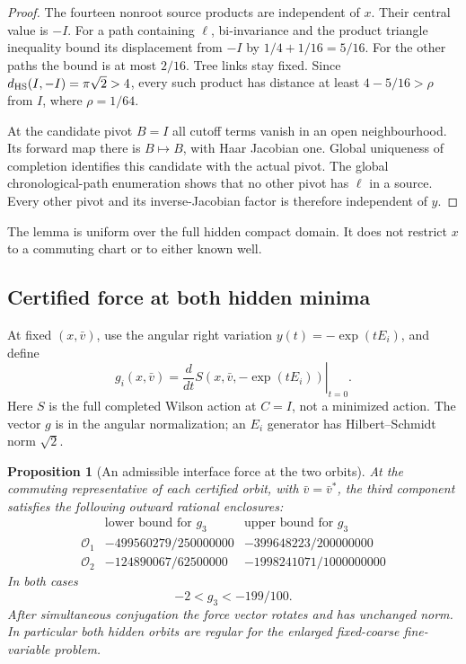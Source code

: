 \documentclass[11pt,oneside]{article}
\newtheorem{proposition}[theorem]{Proposition}
\begin{document}
\begin{proof}
The fourteen nonroot source products are independent
of \(x\). Their central value is \(-I\). For a path
containing \(\ell\), bi-invariance and the product
triangle inequality bound its displacement from
\(-I\) by \(1/4+1/16=5/16\). For the other paths
the bound is at most \(2/16\). Tree links stay fixed.
Since \(d_{\rm HS}(I,-I)=\pi\sqrt2>4\), every such
product has distance at least \(4-5/16>\rho\)
from \(I\), where \(\rho=1/64\).

At the candidate pivot \(B=I\) all cutoff terms
vanish in an open neighbourhood. Its forward map
there is \(B\mapsto B\), with Haar Jacobian one.
Global uniqueness of completion identifies this
candidate with the actual pivot. The global
chronological-path enumeration shows that no
other pivot has \(\ell\) in a source. Every other
pivot and its inverse-Jacobian factor is therefore
independent of \(y\).
\end{proof}

The lemma is uniform over the full hidden compact
domain. It does not restrict \(x\) to a commuting
chart or to either known well.

\subsection{Certified force at both hidden minima}

At fixed \((x,\bar v)\), use the angular right
variation \(y(t)=-\exp(tE_i)\), and define
\[
 g_i(x,\bar v)=
   \left.\frac{d}{dt}S(x,\bar v,-\exp(tE_i))\right|_{t=0}.
\]
Here \(S\) is the full completed Wilson action at
\(C=I\), not a minimized action. The vector \(g\)
is in the angular normalization; an \(E_i\)
generator has Hilbert--Schmidt norm \(\sqrt2\).

\begin{proposition}[An admissible interface force at the two orbits]
\label{prop:f13v12-force}
At the commuting representative of each certified
orbit, with \(\bar v=\bar v^*\), the third component
satisfies the following outward rational enclosures:
\[
\begin{array}{c|cc}
 &\text{lower bound for }g_3&\text{upper bound for }g_3\\ \hline
\mathcal O_1&-499560279/250000000&-399648223/200000000\\
\mathcal O_2&-124890067/62500000&-1998241071/1000000000
\end{array}
\]
In both cases
\[
                  -2<g_3<-199/100 .
\]
After simultaneous conjugation the force vector
rotates and has unchanged norm. In particular both
hidden orbits are regular for the enlarged
\emph{fixed-coarse} fine-variable problem.
\end{proposition}
\end{document}
